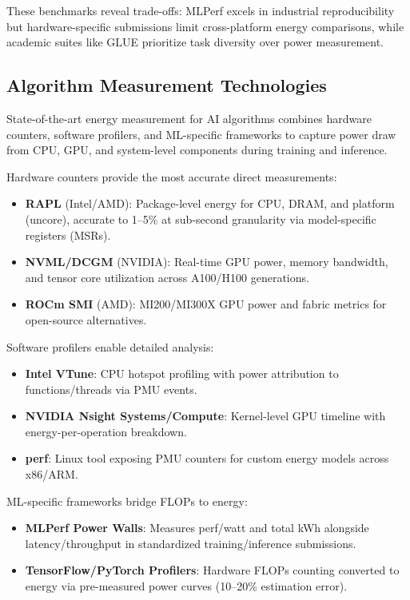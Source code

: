 These benchmarks reveal trade-offs: MLPerf excels in industrial reproducibility but hardware-specific submissions limit cross-platform energy comparisons, while academic suites like GLUE prioritize task diversity over power measurement.

\subsection{Algorithm Measurement Technologies}

State-of-the-art energy measurement for AI algorithms combines hardware counters, software profilers, and ML-specific frameworks to capture power draw from CPU, GPU, and system-level components during training and inference.

Hardware counters provide the most accurate direct measurements:
\begin{itemize}
    \item \textbf{RAPL} (Intel/AMD): Package-level energy for CPU, DRAM, and platform (uncore), accurate to 1--5\% at sub-second granularity via model-specific registers (MSRs).
    \item \textbf{NVML/DCGM} (NVIDIA): Real-time GPU power, memory bandwidth, and tensor core utilization across A100/H100 generations.
    \item \textbf{ROCm SMI} (AMD): MI200/MI300X GPU power and fabric metrics for open-source alternatives.
\end{itemize}

Software profilers enable detailed analysis:
\begin{itemize}
    \item \textbf{Intel VTune}: CPU hotspot profiling with power attribution to functions/threads via PMU events.
    \item \textbf{NVIDIA Nsight Systems/Compute}: Kernel-level GPU timeline with energy-per-operation breakdown.
    \item \textbf{perf}: Linux tool exposing PMU counters for custom energy models across x86/ARM.\@
\end{itemize}

ML-specific frameworks bridge FLOPs to energy:
\begin{itemize}
    \item \textbf{MLPerf Power Walls}: Measures perf/watt and total kWh alongside latency/throughput in standardized training/inference submissions.
    \item \textbf{TensorFlow/PyTorch Profilers}: Hardware FLOPs counting converted to energy via pre-measured power curves (10--20\% estimation error).
\end{itemize}

